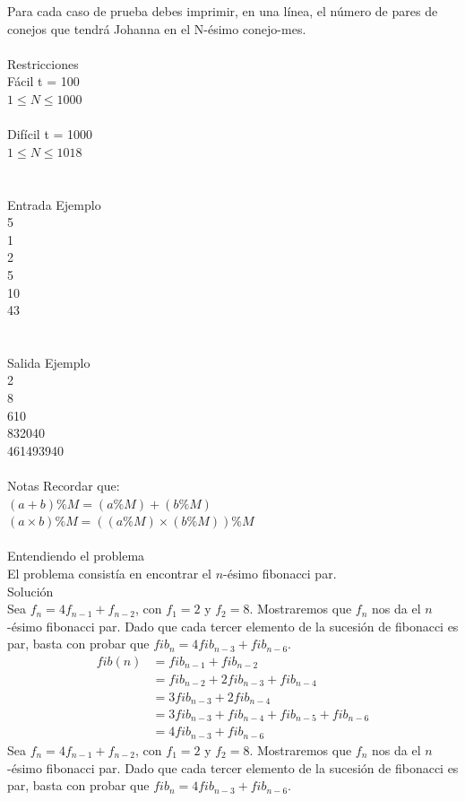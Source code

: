 \documentclass[12pt]{article}
\begin{document}
Para cada caso de prueba debes imprimir, en una línea, el número de pares de conejos que tendrá Johanna en el N-ésimo conejo-mes.\\
\\Restricciones
\\Fácil
t = 100\\
$1 ≤ N ≤ 1000$\\
\\Difícil
t = 1000\\
$1 ≤ N ≤ 1018$\\
\\
\\
\textrm{\large Entrada Ejemplo}
\\
5\\
1\\
2\\
5\\
10\\
43\\
\\
\\
\textrm{\large Salida Ejemplo}
\\
2\\
8\\
610\\
832040\\
461493940\\
\\Notas
Recordar que:\\
$(a + b) \%M = (a \%M) + (b \%M)$
$(a × b) \%M = ((a \%M) × (b \%M)) \%M$\\
\\
\textrm{\large Entendiendo el problema}\\
El problema consistía en encontrar el $n$-ésimo fibonacci par. \\

\textrm{\large Solución}\\
Sea $f_n = 4f_{n-1} + f_{n-2}$, con $f_1 = 2$ y $f_2 = 8$. Mostraremos que $f_n$ nos da el $n$-ésimo fibonacci par. Dado que cada tercer elemento de la sucesión de fibonacci es par, basta con probar que $fib_n = 4fib_{n-3} + fib_{n-6}$.
\begin{align*}
fib(n) & = fib_{n-1} + fib_{n-2} \\
       & = fib_{n-2} + 2fib_{n-3} + fib_{n-4} \\
       & = 3fib_{n-3} + 2fib_{n-4} \\
       & = 3fib_{n-3} + fib_{n-4} + fib_{n-5} + fib_{n-6} \\
       & = 4fib_{n-3} + fib_{n-6}
\end{align*}
Sea $f_n = 4f_{n-1} + f_{n-2}$, con $f_1 = 2$ y $f_2 = 8$. Mostraremos que $f_n$ nos da el $n$-ésimo fibonacci par. Dado que cada tercer elemento de la sucesión de fibonacci es par, basta con probar que $fib_n = 4fib_{n-3} + fib_{n-6}$.
\end{document}
